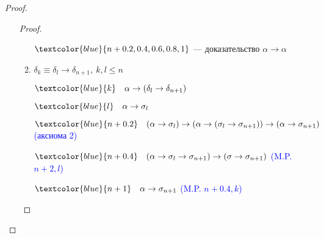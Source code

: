 \documentclass[12pt, a4paper, oneside]{book}
\begin{document}
\begin{proof}
\begin{itemize}
\begin{proof}
\begin{enumerate}
                            \(\textcolor{blue}{n + 0.2, 0.4, 0.6, 0.8, 1}\) --- доказательство \(\alpha \to \alpha\)

                      \item \(\delta_k \equiv \delta_l \to \delta_{n + 1},\ k, l \leq n\)

                            \(\textcolor{blue}{k} \quad \alpha \to (\delta_l \to \delta_{n + 1})\)

                            \(\textcolor{blue}{l} \quad  \alpha \to \sigma_l\)

                            \(\textcolor{blue}{n + 0.2} \quad (\alpha \to \sigma_l) \to (\alpha \to (\sigma_l \to \sigma_{n + 1})) \to (\alpha \to \sigma_{n + 1})\) \textcolor{blue}{(аксиома 2)}

                            \(\textcolor{blue}{n + 0.4} \quad (\alpha \to \sigma_l \to \sigma_{n + 1}) \to (\sigma \to \sigma_{n + 1})\) \textcolor{blue}{(M.P. \(n + 2, l\))}

                            \(\textcolor{blue}{n + 1} \quad \alpha \to \sigma_{n + 1}\) \textcolor{blue}{(M.P. \(n + 0.4, k\))}
                  \end{enumerate}
              \end{proof}
    \end{itemize}
\end{proof}
\end{document}

